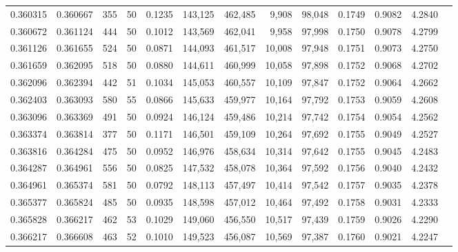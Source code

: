 \begin{tabular}{rrrrrrrrrrrrr}
0.360315 & 0.360667 &   355 &  50 &                                     0.1235 & 143,125 & 462,485 &   9,908 &  98,048 & 0.1749 & 0.9082 & 4.2840 \\
0.360672 & 0.361124 &   444 &  50 &                                     0.1012 & 143,569 & 462,041 &   9,958 &  97,998 & 0.1750 & 0.9078 & 4.2799 \\
0.361126 & 0.361655 &   524 &  50 &                                     0.0871 & 144,093 & 461,517 &  10,008 &  97,948 & 0.1751 & 0.9073 & 4.2750 \\
0.361659 & 0.362095 &   518 &  50 &                                     0.0880 & 144,611 & 460,999 &  10,058 &  97,898 & 0.1752 & 0.9068 & 4.2702 \\
0.362096 & 0.362394 &   442 &  51 &                                     0.1034 & 145,053 & 460,557 &  10,109 &  97,847 & 0.1752 & 0.9064 & 4.2662 \\
0.362403 & 0.363093 &   580 &  55 &                                     0.0866 & 145,633 & 459,977 &  10,164 &  97,792 & 0.1753 & 0.9059 & 4.2608 \\
0.363096 & 0.363369 &   491 &  50 &                                     0.0924 & 146,124 & 459,486 &  10,214 &  97,742 & 0.1754 & 0.9054 & 4.2562 \\
0.363374 & 0.363814 &   377 &  50 &                                     0.1171 & 146,501 & 459,109 &  10,264 &  97,692 & 0.1755 & 0.9049 & 4.2527 \\
0.363816 & 0.364284 &   475 &  50 &                                     0.0952 & 146,976 & 458,634 &  10,314 &  97,642 & 0.1755 & 0.9045 & 4.2483 \\
0.364287 & 0.364961 &   556 &  50 &                                     0.0825 & 147,532 & 458,078 &  10,364 &  97,592 & 0.1756 & 0.9040 & 4.2432 \\
0.364961 & 0.365374 &   581 &  50 &                                     0.0792 & 148,113 & 457,497 &  10,414 &  97,542 & 0.1757 & 0.9035 & 4.2378 \\
0.365377 & 0.365824 &   485 &  50 &                                     0.0935 & 148,598 & 457,012 &  10,464 &  97,492 & 0.1758 & 0.9031 & 4.2333 \\
0.365828 & 0.366217 &   462 &  53 &                                     0.1029 & 149,060 & 456,550 &  10,517 &  97,439 & 0.1759 & 0.9026 & 4.2290 \\
0.366217 & 0.366608 &   463 &  52 &                                     0.1010 & 149,523 & 456,087 &  10,569 &  97,387 & 0.1760 & 0.9021 & 4.2247 \\

\end{tabular}
